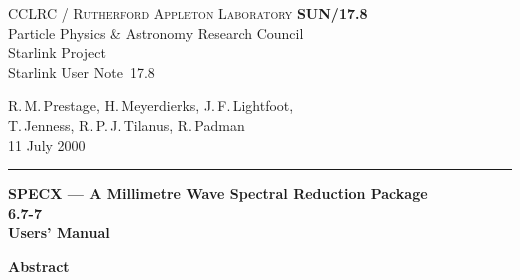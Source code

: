 \documentclass[twoside,11pt]{article}
\newcommand{\stardoccategory}  {Starlink User Note}
\newcommand{\stardocinitials}  {SUN}
\newcommand{\stardocnumber}    {17.8}
\newcommand{\stardocauthors}   {R.\,M.\,Prestage, H.\,Meyerdierks,
J.\,F.\,Lightfoot, \\ T.\,Jenness, R.\,P.\,J.\,Tilanus, R.\,Padman}
\newcommand{\stardocdate}      {11 July 2000}
\newcommand{\stardoctitle}     {SPECX --- A Millimetre Wave Spectral Reduction 
Package}
\newcommand{\stardocversion}   {6.7-7}
\newcommand{\stardocmanual}    {Users' Manual}
\newcommand{\stardocname}{\stardocinitials /\stardocnumber}
\newenvironment{latexonly}{}{}
\renewcommand{\_}{\texttt{\symbol{95}}}
\begin{document}
\thispagestyle{empty}

\begin{latexonly}
   CCLRC / \textsc{Rutherford Appleton Laboratory} \hfill \textbf{\stardocname}\\
   {\large Particle Physics \& Astronomy Research Council}\\
   {\large Starlink Project\\}
   {\large \stardoccategory\ \stardocnumber}
   \begin{flushright}
   \stardocauthors\\
   \stardocdate
   \end{flushright}
   \vspace{-4mm}
   \rule{\textwidth}{0.5mm}
   \vspace{5mm}
   \begin{center}
   {\Huge\textbf{\stardoctitle \\ [2.5ex]}}
   {\LARGE\textbf{\stardocversion \\ [4ex]}}
   {\Huge\textbf{\stardocmanual}}
   \end{center}
   \vspace{5mm}


   \vspace{10mm}
   \begin{center}
      {\Large\textbf{Abstract}}
   \end{center}
\end{latexonly}
\end{document}
